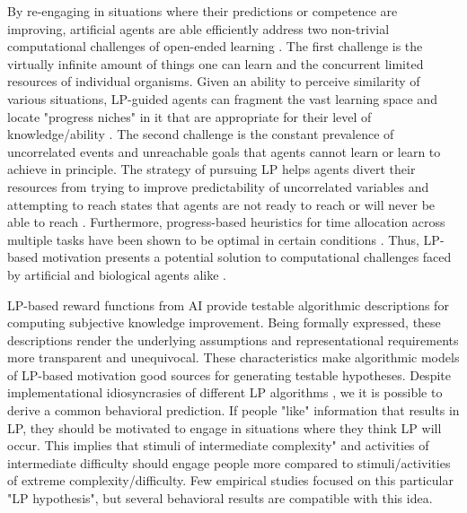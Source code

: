 By re-engaging in situations where their predictions or competence are improving, artificial agents are able efficiently address two non-trivial computational challenges of open-ended learning \cite{gottlieb_information-seeking_2013}. The first challenge is the virtually infinite amount of things one can learn and the concurrent limited resources of individual organisms. Given an ability to perceive similarity of various situations, \ac{LP}-guided agents can fragment the vast learning space and locate "progress niches" in it that are appropriate for their level of knowledge/ability \cite[e.g. ][]{oudeyer_intrinsic_2007,forestier_intrinsically_2020,etcheverry_hierarchically_2021}. The second challenge is the constant prevalence of uncorrelated events and unreachable goals that agents cannot learn or learn to achieve in principle. The strategy of pursuing \ac{LP} helps agents divert their resources from trying to improve predictability of uncorrelated variables and attempting to reach states that agents are not ready to reach or will never be able to reach \cite[e.g., ][]{forestier_intrinsically_2020, colas_curious_2019}. Furthermore, progress-based heuristics for time allocation across multiple tasks have been shown to be optimal in certain conditions \cite{son_metacognitive_2006,lopes_strategic_2012}. Thus, \ac{LP}-based motivation presents a potential solution to computational challenges faced by artificial and biological agents alike \cite{gottlieb_information-seeking_2013,gottlieb_towards_2018,oudeyer_computational_2018}.

\ac{LP}-based reward functions from \ac{AI} provide testable algorithmic descriptions for computing subjective knowledge improvement. Being formally expressed, these descriptions render the underlying assumptions and representational requirements more transparent and unequivocal. These characteristics make algorithmic models of \ac{LP}-based motivation good sources for generating testable hypotheses. Despite implementational idiosyncrasies of different \ac{LP} algorithms \cite[see][]{oudeyer_intrinsic_2007,linke_adapting_2020}, we it is possible to derive a common behavioral prediction. If people "like" information that results in \ac{LP}, they should be motivated to engage in situations where they think \ac{LP} will occur. This implies that stimuli of intermediate complexity" and activities of intermediate difficulty should engage people more compared to stimuli/activities of extreme complexity/difficulty. Few empirical studies focused on this particular "\ac{LP} hypothesis", but several behavioral results are compatible with this idea.

